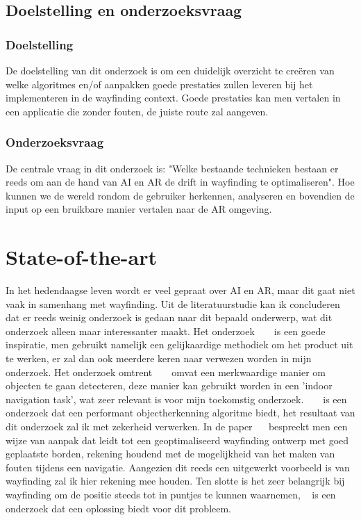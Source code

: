 \subsection{Doelstelling en onderzoeksvraag}
\subsubsection{Doelstelling}
De doelstelling van dit onderzoek is om een duidelijk overzicht te creëren van welke algoritmes en/of aanpakken goede prestaties zullen leveren bij het implementeren in de wayfinding context. Goede prestaties kan men vertalen in een applicatie die zonder fouten, de juiste route zal aangeven.
\subsubsection{Onderzoeksvraag}
De centrale vraag in dit onderzoek is: "Welke bestaande technieken bestaan er reeds om aan de hand van AI en AR de drift in wayfinding te optimaliseren". Hoe kunnen we de wereld rondom de gebruiker herkennen, analyseren en bovendien de input op een bruikbare manier vertalen naar de AR omgeving.


\section{State-of-the-art}
\label{sec:state-of-the-art}
In het hedendaagse leven wordt er veel gepraat over AI en AR, maar dit gaat niet vaak in samenhang met wayfinding.
Uit de literatuurstudie kan ik concluderen dat er reeds weinig onderzoek is gedaan naar dit bepaald onderwerp, wat dit onderzoek alleen maar interessanter maakt.
Het onderzoek ~ ~\autocite{Pouria2016} is een goede inspiratie, men gebruikt namelijk een gelijkaardige methodiek om het product uit te werken, er zal dan ook meerdere keren naar verwezen worden in mijn onderzoek.
Het onderzoek omtrent ~ ~\autocite{Zhang2017}  omvat een merkwaardige manier om objecten te gaan detecteren, deze manier kan gebruikt worden in een 'indoor navigation task', wat zeer relevant is voor mijn toekomstig onderzoek.
~ ~\autocite{Liang2015} is een onderzoek dat een performant objectherkenning algoritme biedt, het resultaat van dit onderzoek zal ik met zekerheid verwerken.
In de paper ~~\autocite{Haikun2017} bespreekt men een wijze van aanpak dat leidt tot een geoptimaliseerd wayfinding ontwerp met goed geplaatste borden, rekening houdend met de mogelijkheid van het maken van fouten tijdens een navigatie. Aangezien dit reeds een uitgewerkt voorbeeld is van wayfinding zal ik hier rekening mee houden.
Ten slotte is het zeer belangrijk bij wayfinding om de positie steeds tot in puntjes te kunnen waarnemen,  ~\autocite{Motlagh2009} is een onderzoek dat een oplossing biedt voor dit probleem.
 


